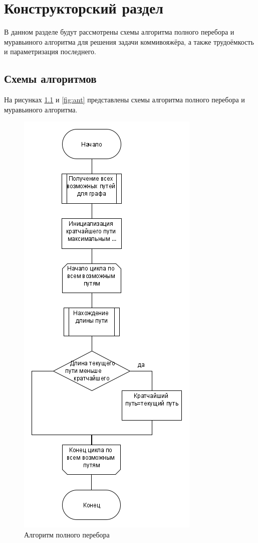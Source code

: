 \chapter{Конструкторский раздел}
\label{cha:design}
В данном разделе будут рассмотрены схемы алгоритма полного перебора и муравьиного алгоритма для решения задачи коммивояжёра, а также трудоёмкость и параметризация последнего.

\section{Схемы алгоритмов}
На рисунках \ref{fig:bf} и \ref{fig:ant} представлены схемы алгоритма полного перебора и муравьиного алгоритма.
\begin{figure}[H]
	\centering
	\includegraphics[width=0.5\linewidth]{src/bf}
	\caption{Алгоритм полного перебора}
	\label{fig:bf}
\end{figure}
